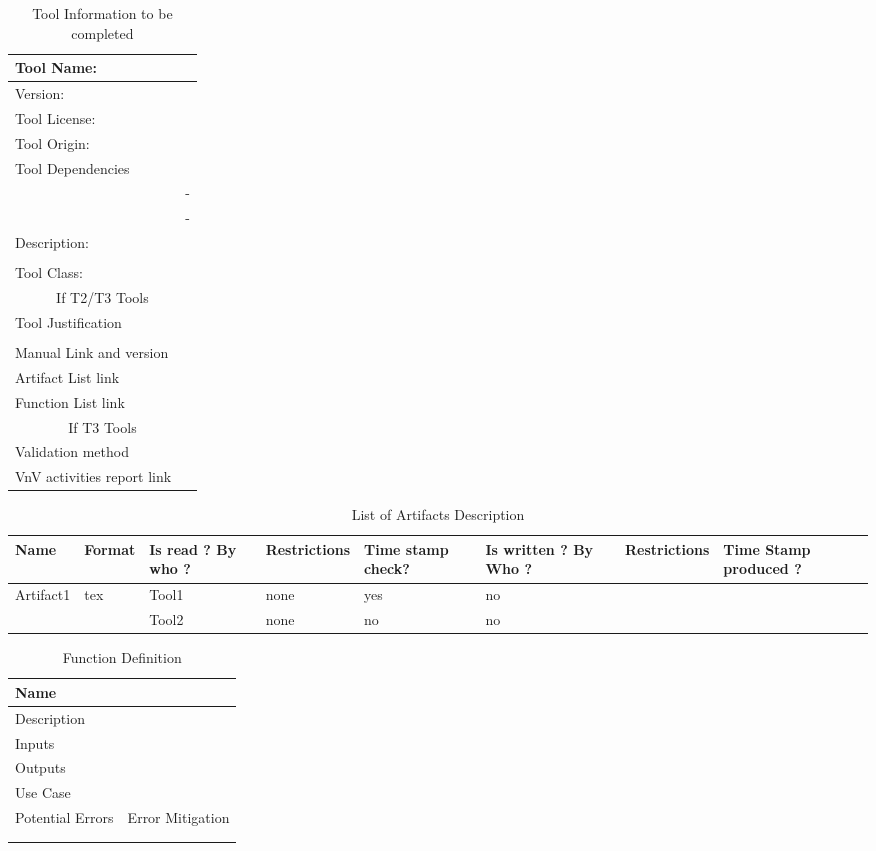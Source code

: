 \begin{table}[htbp]
\centering
\caption{\label{tbl:tool-info}Tool Information to be completed}
\begin{tabular}{|l|p{5cm}|}\hline
Tool Name: & \\\hline
Version: & \\\hline
Tool License: & \\\hline
Tool Origin: &\\\hline
Tool Dependencies & \\
 & -\\
 & -\\ \hline
Description: & \\
 & \\ \hline
Tool Class: & \\\hline
\multicolumn{2}{|c|}{If T2/T3 Tools}\\\hline
Tool Justification & \\
 & \\ \hline
Manual Link and version & \\\hline
Artifact List link & \\\hline
Function List link& \\\hline
\multicolumn{2}{|c|}{If T3 Tools}\\\hline
Validation method& \\\hline
VnV activities report link&\\\hline
\end{tabular}
\end{table}


\begin{table}[htbp]
\caption{\label{tbl:artifacts} List of  Artifacts Description}
{\small
\begin{tabular}{|p{4em}|l|p{1.5cm}|l|p{5em}|p{1.8cm}|l|p{5em}|}\hline
Name & Format & Is read ? By who ?& Restrictions & Time stamp check? &Is
written ? By Who ?& Restrictions & Time Stamp produced ?\\\hline
\multirow{2}{*}{Artifact1} & \multirow{2}{*}{tex} & Tool1 & none & yes &no & &\\\cline{3-8}
                           & & Tool2 & none& no & no & &\\\hline
\end{tabular}
}
\end{table}


\begin{table}[htbp]
\centering
\caption{\label{tbl:functions} Function Definition}
\begin{tabular}{|p{5cm}|p{5cm}|}\hline
Name&\\\hline
Description& \\\hline
Inputs & \\\hline
Outputs & \\\hline
Use Case & \\\hline\hline
Potential Errors & Error Mitigation \\\hline
&  \\\hline
&  \\\hline
\end{tabular}
\end{table}

